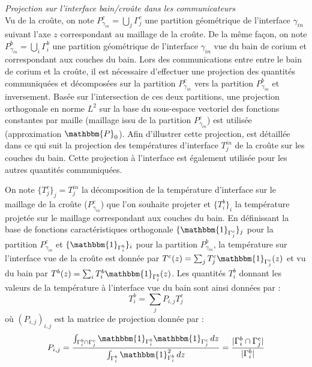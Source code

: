 {\it Projection sur l'interface bain/croûte dans les communicateurs}\\
Vu de la croûte, on note $P_{\gamma_{in}}^{c}=\displaystyle{\bigcup_j} \Gamma_j^c$ une partition géométrique de l'interface $\gamma_{in}$ suivant l'axe $z$ correspondant au maillage de la croûte. De la même façon, on note $P_{\gamma_{in}}^{b}=\displaystyle{\bigcup_i} \Gamma_i^b$ une partition géométrique de l'interface $\gamma_{in}$ vue du bain de corium et correspondant aux couches du bain. Lors des communications entre entre le bain de corium et la croûte, il est nécessaire d'effectuer une projection des quantités communiquées et décomposées sur la partition $P_{\gamma_{in}}^{c}$ vers la partition $P_{\gamma_{in}}^{b}$ et inversement. Basée sur l'intersection de ces deux partitions, une projection orthogonale en norme $L^2$ sur la base du sous-espace vectoriel des fonctions constantes par maille (maillage issu de la partition $P_{\gamma_{in}}^{c}$) est utilisée (approximation $\mathbbm{P}_0$). Afin d'illustrer cette projection, est détaillée dans ce qui suit la projection des températures d'interface $T_j^{in}$ de la croûte sur les couches du bain. Cette projection à l'interface est également utilisée pour les autres quantités communiquées.

On note $\{T_j^c\}_j=T_j^{in}$ la décomposition de la température d'interface sur le maillage de la croûte ($P_{\gamma_{in}}^{c}$) que l'on souhaite projeter et $\{T_i^b\}_i$ la température projetée sur le maillage correspondant aux couches du bain.
En définissant la base de fonctions caractéristiques orthogonale $\{{\mathbbm{1}}_{\Gamma_j^c}\}_j$ pour la partition $P_{\gamma_{in}}^{c}$ et  $\{{\mathbbm{1}}_{\Gamma_i^b}\}_i$ pour la partition $P_{\gamma{_{in}}}^{b}$, la température sur l'interface vue de la croûte est donnée par $T^c(z)=\sum_j {T_j^c {\mathbbm{1}}_{\Gamma_j^c}(z)}$ et vu du bain par  $T^b(z)=\sum_i {T_i^b {\mathbbm{1}}_{\Gamma_i^b}(z)}$.
Les quantités $T_i^b$ donnant les valeurs de la température à l'interface vue du bain sont ainsi données par : $$T_i^b=\sum_j P_{i,j} T_j^c$$ où $\left(P_{i,j}\right)_{i,j}$ est la matrice de projection donnée par : $$P_{i,j}=\frac{\int_{\Gamma_i^b\cap\Gamma_j^c}{\mathbbm{1}}_{\Gamma_i^b}{\mathbbm{1}}_{\Gamma_j^c}\, dz}{ \int_{\Gamma_i^b}{\mathbbm{1}}_{\Gamma_i^b}^2\, dz}=\frac{\vert \Gamma_i^b\cap\Gamma_j^c \vert}{\vert \Gamma_i^b \vert}$$

